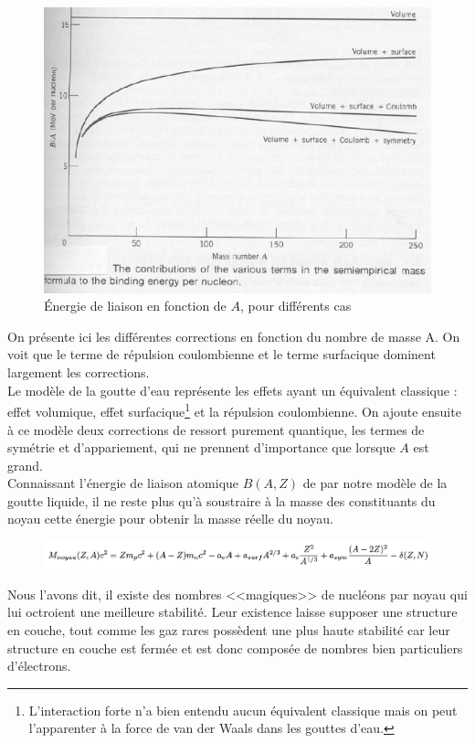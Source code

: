 \begin{figure}[ht]
    \centering
    \includegraphics{Images4/correction.PNG}
    \caption{Énergie de liaison en fonction de $A$, pour différents cas}
\end{figure}
On présente ici les différentes corrections en fonction du nombre de masse A. On voit que le terme de répulsion coulombienne et le terme surfacique dominent largement les corrections.\\
Le modèle de la goutte d'eau représente les effets ayant un équivalent classique : effet volumique, effet surfacique\footnote{L'interaction forte n'a bien entendu aucun équivalent classique mais on peut l'apparenter à la force de van der Waals dans les gouttes d'eau.} et la répulsion coulombienne. On ajoute ensuite à ce modèle deux corrections de ressort purement quantique, les termes de symétrie et d'appariement, qui ne prennent d'importance que lorsque $A$ est grand.\\

Connaissant l'énergie de liaison atomique $B(A,Z)$ de par notre modèle de la goutte liquide, il ne reste plus qu'à soustraire à la masse des constituants du noyau cette énergie pour obtenir la masse réelle du noyau.\\

\begin{figure}[ht]
    \centering
    \includegraphics[width=\textwidth] {Images4/Bethe.PNG}
\end{figure}
Nous l'avons dit, il existe des nombres <<magiques>> de nucléons par noyau qui lui octroient une meilleure stabilité. Leur existence laisse supposer une structure en couche, tout comme les gaz rares possèdent une plus haute stabilité car leur structure en couche est fermée et est donc composée de nombres bien particuliers d'électrons.


